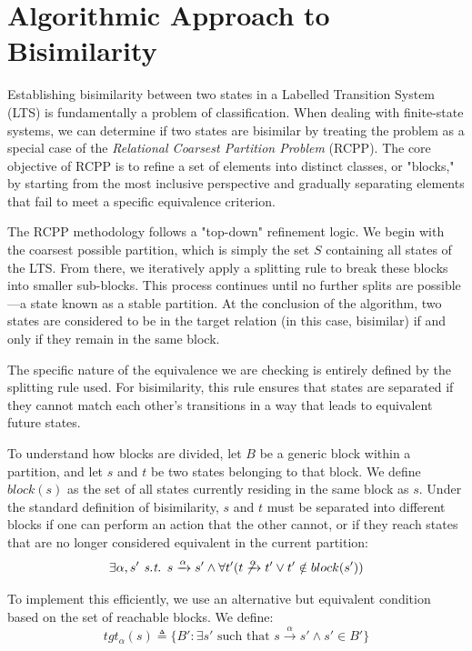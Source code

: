 \section{Algorithmic Approach to Bisimilarity}
Establishing bisimilarity between two states in a Labelled Transition System (LTS) is fundamentally a problem of classification. When dealing with finite-state systems, we can determine if two states are bisimilar by treating the problem as a special case of the \textit{Relational Coarsest Partition Problem} (RCPP). The core objective of RCPP is to refine a set of elements into distinct classes, or "blocks," by starting from the most inclusive perspective and gradually separating elements that fail to meet a specific equivalence criterion.

The RCPP methodology follows a "top-down" refinement logic. We begin with the coarsest possible partition, which is simply the set $S$ containing all states of the LTS. From there, we iteratively apply a splitting rule to break these blocks into smaller sub-blocks. This process continues until no further splits are possible—a state known as a stable partition. At the conclusion of the algorithm, two states are considered to be in the target relation (in this case, bisimilar) if and only if they remain in the same block.

The specific nature of the equivalence we are checking is entirely defined by the splitting rule used. For bisimilarity, this rule ensures that states are separated if they cannot match each other's transitions in a way that leads to equivalent future states.

To understand how blocks are divided, let $B$ be a generic block within a partition, and let $s$ and $t$ be two states belonging to that block. We define $block(s)$ as the set of all states currently residing in the same block as $s$. Under the standard definition of bisimilarity, $s$ and $t$ must be separated into different blocks if one can perform an action that the other cannot, or if they reach states that are no longer considered equivalent in the current partition:
\begin{equation*}
    \exists\alpha, s'\textit{ s.t. }s\xrightarrow{\alpha}s'\land\forall t'(t\not\xrightarrow{\alpha}t'\lor t'\notin block(s'))
\end{equation*}

To implement this efficiently, we use an alternative but equivalent condition based on the set of reachable blocks. We define:
\begin{equation*}
    tgt_{\alpha}(s) \triangleq \{B' : \exists s' \text{ such that } s \xrightarrow{\alpha} s' \wedge s' \in B'\}
\end{equation*}

